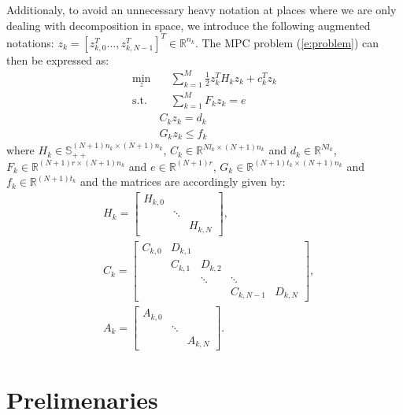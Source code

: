 Additionaly, to avoid an unnecessary heavy notation at places where we are only dealing with decomposition in space, we introduce the following augmented notations: $z_k = [z_{k,0}^T \dots, z_{k,N-1}^T]^T \in \mathbb{R}^{n_k}$. The MPC problem (\ref{e:problem}) can then be expressed as:
\begin{subequations}
\label{e:problem1}
\begin{align}
\min_z & \quad \sum_{k=1}^{M} \frac{1}{2}z_k^TH_k z_k + c_k^Tz_k \label{e:1} \\
\text{s.t.} & \quad \sum_{k=1}^{M} F_k z_k = e \label{e:CoupConst} \\
& C_k z_k = d_k \label{e:3} \\
& G_k z_k \leq f_k \label{e:ineqConst}
\end{align}
\end{subequations}
where $H_{k} \in \mathbb{S}_{++}^{(N+1)n_{k} \times (N+1)n_{k}}$, $C_{k} \in \mathbb{R}^{N l_{k} \times (N+1)n_{k}}$ and $d_{k} \in \mathbb{R}^{N l_{k}}$, $F_{k} \in \mathbb{R}^{(N+1) r \times (N+1) n_{k}}$ and $e \in \mathbb{R}^{(N+1)r}$, $G_{k} \in \mathbb{R}^{(N+1) t_{k} \times (N+1) n_{k}}$ and $f_{k} \in \mathbb{R}^{(N+1) t_{k}}$ and the matrices are accordingly given by:
\begin{subequations}
\begin{align*}
& H_k = \left[ \begin{array}{ccc}
H_{k,0} & & \\
 & \ddots & \\
 & & H_{k,N}
\end{array} \right], \\
& C_k = \left[ \begin{array}{ccccc} 
C_{k,0} & D_{k,1} &  &   &  \\
 & C_{k,1} & D_{k,2} &  &  \\
 &  & \ddots & \ddots &  \\
 &  &  & C_{k,N-1} & D_{k,N}
\end{array} \right], \\
& A_k = \left[ \begin{array}{ccc}
A_{k,0} & & \\
 & \ddots & \\
 & & A_{k,N}
\end{array} \right].
\end{align*}
\end{subequations}

\section{Prelimenaries}

